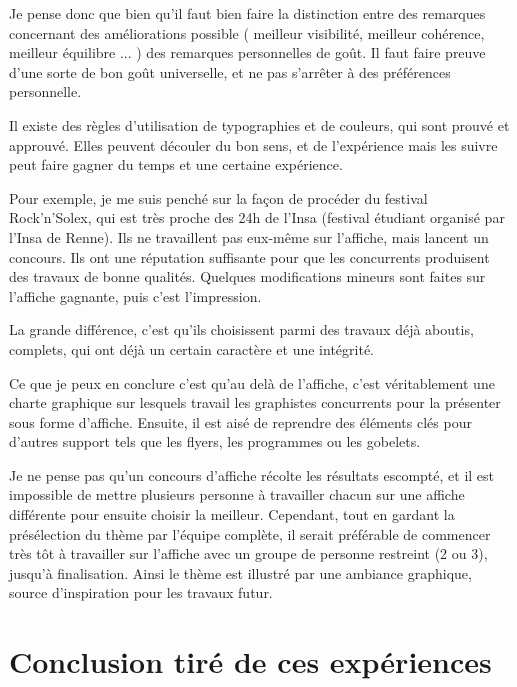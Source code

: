         Je pense donc que bien qu'il faut bien faire la distinction entre des remarques concernant des améliorations possible ( meilleur visibilité, meilleur cohérence, meilleur équilibre ... ) des remarques personnelles de goût.
        Il faut faire preuve d'une sorte de bon goût universelle, et ne pas s'arrêter à des préférences personnelle.
        
        Il existe des règles d'utilisation de typographies et de couleurs, qui sont prouvé et approuvé. Elles peuvent découler du bon sens, et de l'expérience mais les suivre peut faire gagner du temps et une certaine expérience.
        
        Pour exemple, je me suis penché sur la façon de procéder du festival Rock'n'Solex, qui est très proche des 24h de l'Insa (festival étudiant organisé par l'Insa de Renne).
        Ils ne travaillent pas eux-même sur l'affiche, mais lancent un concours. Ils ont une réputation suffisante pour que les concurrents produisent des travaux de bonne qualités.
        Quelques modifications mineurs sont faites sur l'affiche gagnante, puis c'est l'impression.
        
        La grande différence, c'est qu'ils choisissent parmi des travaux déjà aboutis, complets, qui ont déjà un certain caractère et une intégrité. 
        
        Ce que je peux en conclure c'est qu'au delà de l'affiche, c'est véritablement une charte graphique sur lesquels travail les graphistes concurrents pour la présenter sous forme d'affiche. Ensuite, il est aisé de reprendre des éléments clés pour d'autres support tels que les flyers, les programmes ou les gobelets.
        
        Je ne pense pas qu'un concours d'affiche récolte les résultats escompté, et il est impossible de mettre plusieurs personne à travailler chacun sur une affiche différente pour ensuite choisir la meilleur.
        Cependant, tout en gardant la présélection du thème par l'équipe complète, il serait préférable de commencer très tôt à travailler sur l'affiche avec un groupe de personne restreint (2 ou 3), jusqu'à finalisation. Ainsi le thème est illustré par une ambiance graphique, source d'inspiration pour les travaux futur.
        
        
\section{Conclusion tiré de ces expériences}


